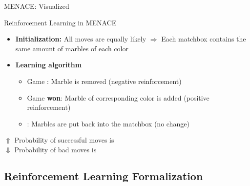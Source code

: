 \begin{frame}{MENACE: Visualized}{}
	
\end{frame}


\begin{frame}{Reinforcement Learning in MENACE}{}
	\begin{itemize}
		\item \textbf{Initialization:} All moves are equally likely $\Rightarrow$ Each matchbox contains the same amount
			of marbles of each color
		\item \textbf{Learning algorithm}
		\begin{itemize}
			\item Game : Marble is removed (negative reinforcement)
			\item Game \textcolor{green!80!black}{\textbf{won}}: Marble of corresponding color is added (positive reinforcement)
			\item {}: Marbles are put back into the matchbox (no change)
		\end{itemize}
	\end{itemize}
	
	\vspace*{2mm}
	\begin{boxBlueNoFrame}
		$\bm{\Uparrow}$ Probability of successful moves is  \\
		$\bm{\Downarrow}$ Probability of bad moves is 
	\end{boxBlueNoFrame}
\end{frame}


\subsection{Reinforcement Learning Formalization}

